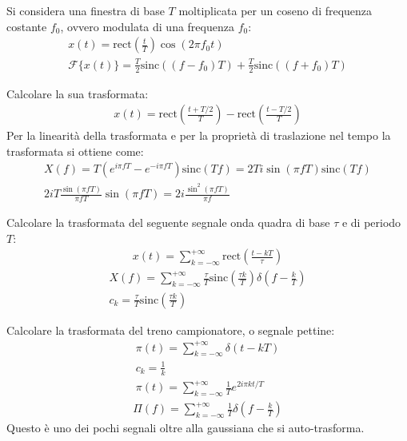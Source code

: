 \documentclass{article}
\newcommand{\rect}{\mathrm{rect}}
\newcommand{\sinc}{\mathrm{sinc}}
\begin{document}
Si considera una finestra di base $T$ moltiplicata per un coseno di frequenza costante $f_0$, ovvero modulata di una frequenza $f_0$:
\begin{gather*}
    x(t)=\rect\displaystyle\left(\frac{t}{T}\right)\cos(2\pi f_0t)\\
    \mathscr{F}\{x(t)\}=\frac{T}{2}\sinc((f-f_0)T)+\frac{T}{2}\sinc\left((f+f_0)T\right)
\end{gather*}
\begin{center}
\end{center}
Calcolare la sua trasformata:
\begin{gather*}
    x(t)=\rect\left(\displaystyle\frac{t+T/2}{T}\right)-\rect\left(\displaystyle\frac{t-T/2}{T}\right)
\end{gather*}
Per la linearità della trasformata e per la proprietà di traslazione nel tempo la trasformata si ottiene come:
\begin{gather*}
    X(f)=T\left(e^{i\pi fT}-e^{-i\pi fT}\right)\sinc\left(T f\right)=2Ti\sin(\pi fT)\sinc(Tf)\\
    2iT\displaystyle\frac{\sin(\pi fT)}{\pi fT}\sin(\pi fT)=2i\frac{\sin^2(\pi fT)}{\pi f}
\end{gather*}



Calcolare la trasformata del seguente segnale onda quadra di base $\tau$ e di periodo $T$:
\begin{gather*}
    x(t)=\displaystyle\sum_{k=-\infty}^{+\infty}\rect\left(\frac{t-kT}{\tau}\right)
\end{gather*}
\begin{gather}
    X(f)=\displaystyle\sum_{k=-\infty}^{+\infty}\frac{\tau}{T}\sinc\left(\frac{\tau k}{T}\right)\delta\left(f-\frac{k}{T}\right)\\
    c_k=\displaystyle\frac{\tau}{T}\sinc\left(\frac{\tau k}{T}\right)
\end{gather}

Calcolare la trasformata del treno campionatore, o segnale pettine:
\begin{gather*}
    \pi(t)=\displaystyle\sum_{k=-\infty}^{+\infty}\delta(t-kT)\\
    c_k=\displaystyle\frac{1}{k}\\
    \pi(t)=\displaystyle\sum_{k=-\infty}^{+\infty}\frac{1}{T}e^{2i\pi kt/T}
\end{gather*}
\begin{gather}
    \Pi(f)=\displaystyle\sum_{k=-\infty}^{+\infty}\frac{1}{T}\delta\left(f-\frac{k}{T}\right)
\end{gather}
Questo è uno dei pochi segnali oltre alla gaussiana che si auto-trasforma. 
\end{document}
